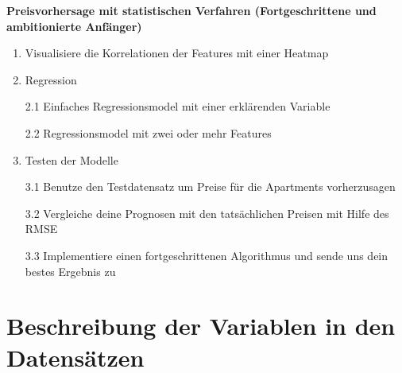 \documentclass[
]{book}
\begin{document}
\textbf{Preisvorhersage mit statistischen Verfahren (Fortgeschrittene und ambitionierte Anfänger)}

\begin{enumerate}
\def\labelenumi{\arabic{enumi}.}
\item
  Visualisiere die Korrelationen der Features mit einer Heatmap
\item
  Regression

  2.1 Einfaches Regressionsmodel mit einer erklärenden Variable

  2.2 Regressionsmodel mit zwei oder mehr Features
\item
  Testen der Modelle

  3.1 Benutze den Testdatensatz um Preise für die Apartments vorherzusagen

  3.2 Vergleiche deine Prognosen mit den tatsächlichen Preisen mit Hilfe des RMSE

  3.3 Implementiere einen fortgeschrittenen Algorithmus und sende uns dein bestes Ergebnis zu
\end{enumerate}

\hypertarget{beschreibung-der-variablen-in-den-datensuxe4tzen}{%
\section{Beschreibung der Variablen in den Datensätzen}\label{beschreibung-der-variablen-in-den-datensuxe4tzen}}
\end{document}
